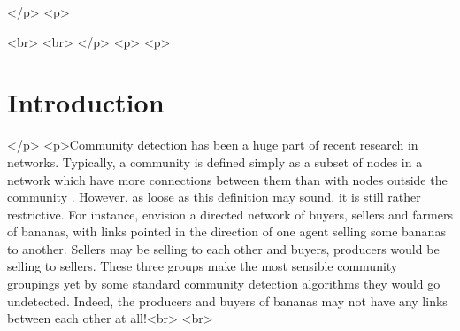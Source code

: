 </p>
<p>\maketitle<br>
\thispagestyle{firststyle}<br>
</p>
<p>%
<p>\section{Introduction}</p>
<p>Community detection has been a huge part of recent research in networks. Typically, a community is defined simply as a subset of nodes in a network which have more connections between them than with nodes outside the community \cite{NetworkNotes}. However, as loose as this definition may sound, it is still rather restrictive. For instance, envision a directed network of buyers, sellers and farmers of bananas, with links pointed in the direction of one agent selling some bananas to another. Sellers may be selling to each other and buyers, producers would be selling to sellers. These three groups make the most sensible community groupings yet by some standard community detection algorithms they would go undetected. Indeed, the producers and buyers of bananas may not have any links between each other at all!<br>
\newline<br>
